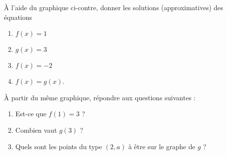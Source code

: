
\begin{exercice}\label{exoSeconde-0070}

    \begin{multicols}{2}

        À l'aide du graphique ci-contre, donner les solutions (approximatives) des équations
        \begin{enumerate}
            \item
                \( f(x)=1\)
            \item
                \( g(x)=3\)
            \item
                \( f(x)=-2\)
            \item
                $f(x)=g(x)$.
        \end{enumerate}

        À partir du même graphique, répondre aux questions suivantes :
        \begin{enumerate}
            \item
                Est-ce que \( f(1)=3\) ?
            \item
                Combien vaut \( g(3)\) ?
            \item
                Quels sont les points du type \( (2,a)\) à être sur le graphe de \( g\) ?
        \end{enumerate}

        \columnbreak





    \end{multicols}

\end{exercice}
